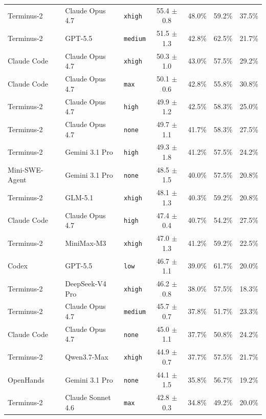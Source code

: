 \begin{table}[t]
\begin{tabular}{l l l c c c c}
Terminus-2     & Claude Opus 4.7           & \texttt{xhigh}  & 55.4 $\pm$ 0.8 & 48.0\% & 59.2\% & 37.5\% \\
Terminus-2     & GPT-5.5                   & \texttt{medium} & 51.5 $\pm$ 1.3 & 42.8\% & 62.5\% & 21.7\% \\
Claude Code    & Claude Opus 4.7           & \texttt{xhigh}  & 50.3 $\pm$ 1.0 & 43.0\% & 57.5\% & 29.2\% \\
Claude Code    & Claude Opus 4.7           & \texttt{max}    & 50.1 $\pm$ 0.6 & 42.8\% & 55.8\% & 30.8\% \\
Terminus-2     & Claude Opus 4.7           & \texttt{high}   & 49.9 $\pm$ 1.2 & 42.5\% & 58.3\% & 25.0\% \\
Terminus-2     & Claude Opus 4.7           & \texttt{none}   & 49.7 $\pm$ 1.1 & 41.7\% & 58.3\% & 27.5\% \\
Terminus-2     & Gemini 3.1 Pro            & \texttt{high}   & 49.3 $\pm$ 1.8 & 41.2\% & 57.5\% & 24.2\% \\
Mini-SWE-Agent & Gemini 3.1 Pro            & \texttt{none}   & 48.5 $\pm$ 1.5 & 40.0\% & 57.5\% & 20.8\% \\
Terminus-2     & GLM-5.1                   & \texttt{xhigh}  & 48.1 $\pm$ 1.3 & 40.3\% & 59.2\% & 20.8\% \\
Claude Code    & Claude Opus 4.7           & \texttt{high}   & 47.4 $\pm$ 0.4 & 40.7\% & 54.2\% & 27.5\% \\
Terminus-2     & MiniMax-M3                & \texttt{xhigh}  & 47.0 $\pm$ 1.3 & 41.2\% & 59.2\% & 22.5\% \\
Codex          & GPT-5.5                   & \texttt{low}    & 46.7 $\pm$ 1.1 & 39.0\% & 61.7\% & 20.0\% \\
Terminus-2     & DeepSeek-V4 Pro           & \texttt{xhigh}  & 46.2 $\pm$ 0.8 & 38.0\% & 57.5\% & 18.3\% \\
Terminus-2     & Claude Opus 4.7           & \texttt{medium} & 45.7 $\pm$ 0.7 & 37.8\% & 51.7\% & 23.3\% \\
Claude Code    & Claude Opus 4.7           & \texttt{none}   & 45.0 $\pm$ 1.1 & 37.7\% & 50.8\% & 24.2\% \\
Terminus-2     & Qwen3.7-Max               & \texttt{xhigh}  & 44.9 $\pm$ 0.7 & 37.7\% & 57.5\% & 21.7\% \\
OpenHands      & Gemini 3.1 Pro            & \texttt{none}   & 44.1 $\pm$ 1.5 & 35.8\% & 56.7\% & 19.2\% \\
Terminus-2     & Claude Sonnet 4.6         & \texttt{max}    & 42.8 $\pm$ 0.3 & 34.8\% & 49.2\% & 20.0\% \\

\end{tabular}
\end{table}
